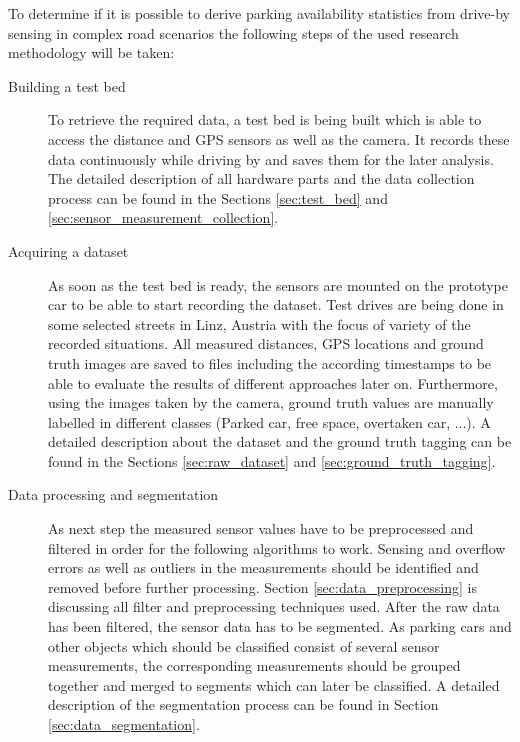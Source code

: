 To determine if it is possible to derive parking availability statistics from drive-by sensing in complex road scenarios the following steps of the used research methodology will be taken:


\begin{description}

\item[Building a test bed] To retrieve the required data, a test bed is being built which is able to access the distance and GPS sensors as well as the camera. It records these data continuously while driving by and saves them for the later analysis. The detailed description of all hardware parts and the data collection process can be found in the Sections \ref{sec:test_bed} and \ref{sec:sensor_measurement_collection}.

\item[Acquiring a dataset] As soon as the test bed is ready, the sensors are mounted on the prototype car to be able to start recording the dataset. Test drives are being done in some selected streets in Linz, Austria with the focus of variety of the recorded situations. All measured distances, GPS locations and ground truth images are  saved to files including the according timestamps to be able to evaluate the results of different approaches later on. Furthermore, using the images taken by the camera, ground truth values are manually labelled in different classes (Parked car, free space, overtaken car, ...). A detailed description about the dataset and the ground truth tagging can be found in the Sections \ref{sec:raw_dataset} and \ref{sec:ground_truth_tagging}.

\item[Data processing and segmentation] As next step the measured sensor values have to be preprocessed and filtered in order for the following algorithms to work. Sensing and overflow errors as well as outliers in the measurements should be identified and removed before further processing. Section \ref{sec:data_preprocessing} is discussing all filter and preprocessing techniques used. After the raw data has been filtered, the sensor data has to be segmented. As parking cars and other objects which should be classified consist of several sensor measurements, the corresponding measurements should be grouped together and merged to segments which can later be classified. A detailed description of the segmentation process can be found in Section \ref{sec:data_segmentation}.


\end{description}
